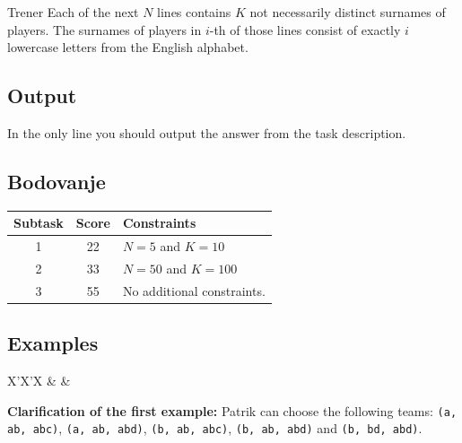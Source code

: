 \begin{statement}[
  problempoints=110,
  timelimit=2 seconds,
  memorylimit=512 MiB,
]{Trener}
Each of the next $N$ lines contains $K$ not necessarily distinct surnames of
players. The surnames of players in $i$-th of those lines consist of exactly
$i$ lowercase letters from the English alphabet.

\subsection*{Output}
In the only line you should output the answer from the task description.

\subsection*{Bodovanje}
{\renewcommand{\arraystretch}{1.4}
  \setlength{\tabcolsep}{6pt}
  \begin{tabular}{ccl}
 Subtask & Score & Constraints \\ \midrule
  1 & 22 & $N = 5$ and $K = 10$ \\
  2 & 33 & $N = 50$ and $K = 100$\\
  3 & 55 & No additional constraints. \\
\end{tabular}}

\subsection*{Examples}
\begin{tabularx}{\textwidth}{X'X'X}
 &
 &
\end{tabularx}

\textbf{Clarification of the first example:}
Patrik can choose the following teams:
\texttt{(a, ab, abc)}, \texttt{(a, ab, abd)},
\texttt{(b, ab, abc)}, \texttt{(b, ab, abd)} and \texttt{(b, bd, abd)}.

\end{statement}

